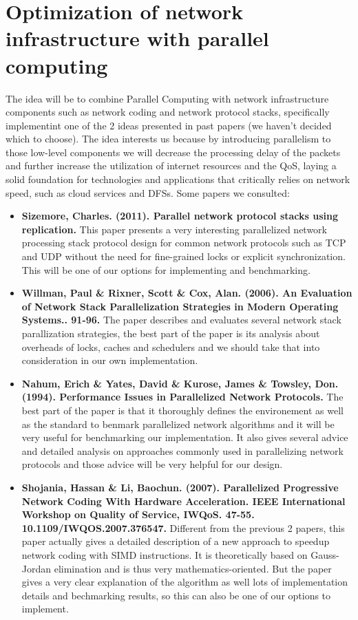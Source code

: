\documentclass[11pt]{article}
\begin{document}
	\section{Optimization of network infrastructure with parallel computing}
	The idea will be to combine Parallel Computing with network infrastructure components such as network coding and network protocol stacks, specifically implementint one of the 2 ideas presented in past papers (we haven't decided which to choose). The idea interests us because by introducing parallelism to those low-level components we will decrease the processing delay of the packets and further increase the utilization of internet resources and the QoS, laying a solid foundation for technologies and applications that critically relies on network speed, such as cloud services and DFSs. Some papers we consulted:
	\begin{itemize}
		\item \textbf{Sizemore, Charles. (2011). Parallel network protocol stacks using replication. }This paper presents a very interesting parallelized network processing stack protocol design for common network protocols such as TCP and UDP without the need for fine-grained locks or explicit synchronization. This will be one of our options for implementing and benchmarking.
		\item \textbf{Willman, Paul \& Rixner, Scott \& Cox, Alan. (2006). An Evaluation of Network Stack Parallelization Strategies in Modern Operating Systems.. 91-96. } The paper describes and evaluates several network stack parallization strategies, the best part of the paper is its analysis about overheads of locks, caches and schedulers and we should take that into consideration in our own implementation.
		\item \textbf{Nahum, Erich \& Yates, David \& Kurose, James \& Towsley, Don. (1994). Performance Issues in Parallelized Network Protocols. } The best part of the paper is that it thoroughly defines the environement as well as the standard to benmark parallelized network algorithms and it will be very useful for benchmarking our implementation. It also gives several advice and detailed analysis on approaches commonly used in parallelizing network protocols and those advice will be very helpful for our design.
		\item \textbf{Shojania, Hassan \& Li, Baochun. (2007). Parallelized Progressive Network Coding With Hardware Acceleration. IEEE International Workshop on Quality of Service, IWQoS. 47-55. 10.1109/IWQOS.2007.376547. } Different from the previous 2 papers, this paper actually gives a detailed description of a new approach to speedup network coding with SIMD instructions. It is theoretically based on Gauss-Jordan elimination and is thus very mathematics-oriented. But the paper gives a very clear explanation of the algorithm as well lots of implementation details and bechmarking results, so this can also be one of our options to implement.
	\end{itemize} 
\end{document}
